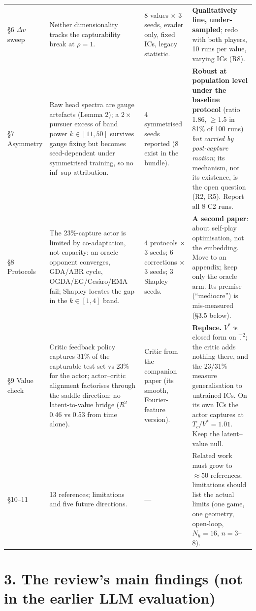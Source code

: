 \documentclass[10pt,a4paper]{article}
\newcommand{\T}{\mathbb{T}^2}
\newcommand{\verdict}[1]{\textbf{#1}}
\begin{document}
\begin{small}
\begin{xltabular}{\textwidth}{@{}p{1.9cm} L L L@{}}
\addlinespace
\S6 $\Delta v$ sweep & Neither dimensionality tracks the capturability break at $\rho=1$. & 8 values $\times$ 3 seeds, evader only, fixed ICs, legacy statistic. & \verdict{Qualitatively fine, under-sampled}; redo with both players, 10 runs per value, varying ICs (R8). \\
\addlinespace
\S7 Asymmetry & Raw head spectra are gauge artefacts (Lemma 2); a $2\times$ pursuer excess of band power $k\in[11,50]$ survives gauge fixing but becomes seed-dependent under symmetrised training, so no inf--sup attribution. & 4 symmetrised seeds reported (8 exist in the bundle). & \verdict{Robust at population level under the baseline protocol} (ratio 1.86, $\ge1.5$ in 81\% of 100 runs) \emph{but carried by post-capture motion}; its mechanism, not its existence, is the open question (R2, R5). Report all 8 C2 runs. \\
\addlinespace
\S8 Protocols & The 23\%-capture actor is limited by co-adaptation, not capacity: an oracle opponent converges, GDA/ABR cycle, OGDA/EG/Ces\`aro/EMA fail; Shapley locates the gap in the $k\in[1,4]$ band. & 4 protocols $\times$ 3 seeds; 6 corrections $\times$ 3 seeds; 3 Shapley seeds. & \verdict{A second paper}: about self-play optimisation, not the embedding. Move to an appendix; keep only the oracle arm. Its premise (``mediocre'') is mis-measured (\S3.5 below). \\
\addlinespace
\S9 Value check & Critic feedback policy captures 31\% of the capturable test set vs 23\% for the actor; actor--critic alignment factorises through the saddle direction; no latent-to-value bridge ($R^2$ 0.46 vs 0.53 from time alone). & Critic from the companion paper (its smooth, Fourier-feature version). & \verdict{Replace.} $V^*$ is closed form on $\T$; the critic adds nothing there, and the 23/31\% measure generalisation to untrained ICs. On its own ICs the actor captures at $T_c/V^*=1.01$. Keep the latent--value null. \\
\addlinespace
\S10--11 & 13 references; limitations and five future directions. & --- & Related work must grow to $\approx50$ references; limitations should list the actual limits (one game, one geometry, open-loop, $N_h=16$, $n=3$--8). \\
\end{xltabular}
\end{small}

\section*{3. The review's main findings (not in the earlier LLM evaluation)}
\end{document}
